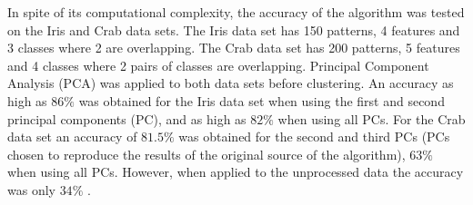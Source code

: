 In spite of its computational complexity, the accuracy of the algorithm was tested on the Iris and Crab data sets.
The Iris data set has 150 patterns, 4 features and 3 classes where 2 are overlapping.
The Crab data set has 200 patterns, 5 features and 4 classes where 2 pairs of classes are overlapping.
Principal Component Analysis (PCA) was applied to both data sets before clustering.
An accuracy as high as $86\%$ was obtained for the Iris data set when using the first and second principal components (PC), and as high as $82\%$ when using all PCs.
For the Crab data set an accuracy of $81.5\%$ was obtained for the second and third PCs (PCs chosen to reproduce the results of the original source of the algorithm), $63\%$ when using all PCs.
However, when applied to the unprocessed data the accuracy was only $34\%$ .













